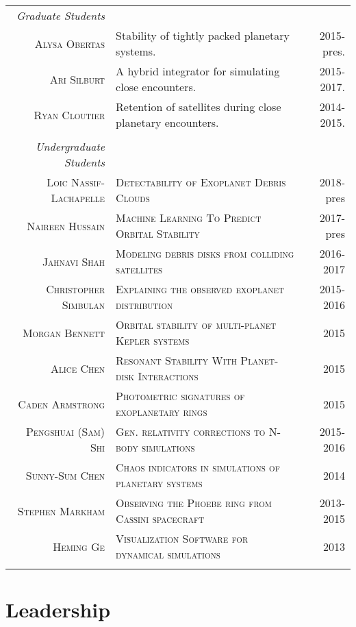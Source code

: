 \documentclass[10pt]{article} %
\begin{document}
\begin{tabular}{r|p{9.6cm}r}

{\it Graduate Students} \\
\textsc{Alysa Obertas} & Stability of tightly packed planetary systems. & 2015-pres. \\
\textsc{Ari Silburt} & A hybrid integrator for simulating close encounters. & 2015-2017. \\
\textsc{Ryan Cloutier} & Retention of satellites during close planetary encounters. & 2014-2015. \\
\\
{\it Undergraduate Students} \\
\textsc{Loic Nassif-Lachapelle} & \textsc{Detectability of Exoplanet Debris Clouds} & 2018-pres \\
\textsc{Naireen Hussain} & \textsc{Machine Learning To Predict Orbital Stability} & 2017-pres \\
\textsc{Jahnavi Shah} & \textsc{Modeling debris disks from colliding satellites} & 2016-2017 \\
\textsc{Christopher Simbulan} & \textsc{Explaining the observed exoplanet distribution} & 2015-2016 \\
\textsc{Morgan Bennett} & \textsc{Orbital stability of multi-planet Kepler systems} & 2015  \\
\textsc{Alice Chen} & \textsc{Resonant Stability With Planet-disk Interactions} & 2015 \\
\textsc{Caden Armstrong} & \textsc{Photometric signatures of exoplanetary rings} & 2015 \\
\textsc{Pengshuai (Sam) Shi} & \textsc{Gen. relativity corrections to N-body simulations} & 2015-2016 \\
\textsc{Sunny-Sum Chen} & \textsc{Chaos indicators in simulations of planetary systems} & 2014 \\
\textsc{Stephen Markham} & \textsc{Observing the Phoebe ring from Cassini spacecraft} & 2013-2015 \\
\textsc{Heming Ge} & \textsc{Visualization Software for dynamical simulations} & 2013 \\
\multicolumn{3}{c}{} \\
\end{tabular}


\section{Leadership}
\end{document}
